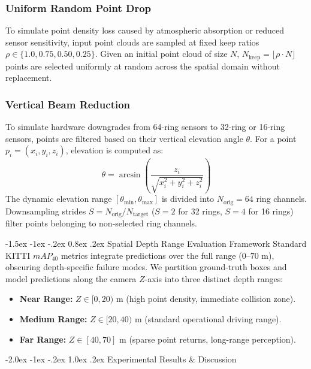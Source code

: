 \documentclass[10pt, a4paper, twocolumn]{article}
\makeatletter
\renewcommand\section{\@startsection{section}{1}{\z@}%
                                   {-2.0ex \@plus -1ex \@minus -.2ex}%
                                   {1.0ex \@plus .2ex}%
                                   {\normalfont\large\bfseries}}
\renewcommand\subsection{\@startsection{subsection}{2}{\z@}%
                                      {-1.5ex \@plus -1ex \@minus -.2ex}%
                                      {0.8ex \@plus .2ex}%
                                      {\normalfont\normalsize\bfseries}}
\makeatother
\begin{document}
\subsubsection{Uniform Random Point Drop}
To simulate point density loss caused by atmospheric absorption or reduced sensor sensitivity, input point clouds are sampled at fixed keep ratios $\rho \in \{1.0, 0.75, 0.50, 0.25\}$. Given an initial point cloud of size $N$, $N_{\text{keep}} = \lfloor \rho \cdot N \rfloor$ points are selected uniformly at random across the spatial domain without replacement.

\subsubsection{Vertical Beam Reduction}
To simulate hardware downgrades from 64-ring sensors to 32-ring or 16-ring sensors, points are filtered based on their vertical elevation angle $\theta$. For a point $p_i = (x_i, y_i, z_i)$, elevation is computed as:
\begin{equation}
\theta = \arcsin\left(\frac{z_i}{\sqrt{x_i^2 + y_i^2 + z_i^2}}\right)
\end{equation}
The dynamic elevation range $[\theta_{\min}, \theta_{\max}]$ is divided into $N_{\text{orig}} = 64$ ring channels. Downsampling strides $S = N_{\text{orig}} / N_{\text{target}}$ ($S=2$ for 32 rings, $S=4$ for 16 rings) filter points belonging to non-selected ring channels.

\subsection{Spatial Depth Range Evaluation Framework}
Standard KITTI $mAP_{40}$ metrics integrate predictions over the full range ($0\text{--}70\text{ m}$), obscuring depth-specific failure modes. We partition ground-truth boxes and model predictions along the camera $Z$-axis into three distinct depth ranges:
\begin{itemize}
    \item \textbf{Near Range:} $Z \in [0, 20)\text{ m}$ (high point density, immediate collision zone).
    \item \textbf{Medium Range:} $Z \in [20, 40)\text{ m}$ (standard operational driving range).
    \item \textbf{Far Range:} $Z \in [40, 70]\text{ m}$ (sparse point returns, long-range perception).
\end{itemize}

\section{Experimental Results \& Discussion}
\end{document}
